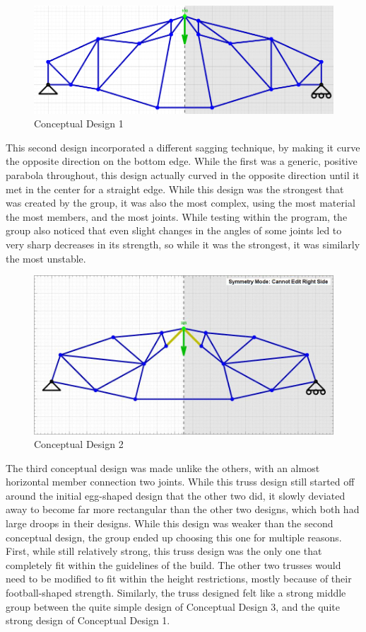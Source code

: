 \documentclass{article}
\begin{document}
\begin{figure}[ht]
\caption{Conceptual Design 1}
\centering
\includegraphics[width=400pt]{truss552.png}
\end{figure}

This second design incorporated a different sagging technique, by making it curve the opposite direction on the bottom edge. While the first was a generic, positive parabola throughout, this design actually curved in the opposite direction until it met in the center for a straight edge. While this design was the strongest that was created by the group, it was also the most complex, using the most material the most members, and the most joints. While testing within the program, the group also noticed that even slight changes in the angles of some joints led to very sharp decreases in its strength, so while it was the strongest, it was similarly the most unstable. 

\begin{figure}[ht]
\caption{Conceptual Design 2}
\centering
\includegraphics[width=400pt]{truss489.jpg}
\end{figure}

The third conceptual design was made unlike the others, with an almost horizontal member connection two joints. While this truss design still started off around the initial egg-shaped design that the other two did, it slowly deviated away to become far more rectangular than the other two designs, which both had large droops in their designs. While this design was weaker than the second conceptual design, the group ended up choosing this one for multiple reasons. First, while still relatively strong, this truss design was the only one that completely fit within the guidelines of the build. The other two trusses would need to be modified to fit within the height restrictions, mostly because of their football-shaped strength. Similarly, the truss designed felt like a strong middle group between the quite simple design of Conceptual Design 3, and the quite strong design of Conceptual Design 1. 
\end{document}
